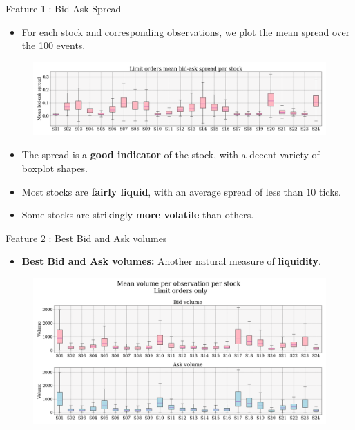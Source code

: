 \documentclass{beamer}
\newcommand{\myitem}{\item[$\rightarrow$]}
\begin{document}
\begin{frame}{Feature 1 : Bid-Ask Spread}
    \begin{itemize}
        \item For each stock and corresponding observations, we plot the mean spread over the 100 events.
    \end{itemize}

    \begin{figure}[H]
        \centering
        \includegraphics[width=\textwidth]{figures/mean_spread_per_stock_mo.png}
    \end{figure}

    \begin{itemize}
        \myitem The spread is a \textbf{good indicator} of the stock, with a decent variety of boxplot shapes.
        \myitem Most stocks are \textbf{fairly liquid}, with an average spread of less than $10$ ticks.
        \myitem Some stocks are strikingly \textbf{more volatile} than others.
    \end{itemize}
\end{frame}

\begin{frame}{Feature 2 : Best Bid and Ask volumes}
    \begin{itemize}
        \item \textbf{Best Bid and Ask volumes:} Another natural measure of \textbf{liquidity}.
    \end{itemize}
    \begin{figure}[H]
        \centering
        \includegraphics[width=\textwidth]{figures/boxplot_volume_per_stock.png}
    \end{figure}
\end{frame}
\end{document}
